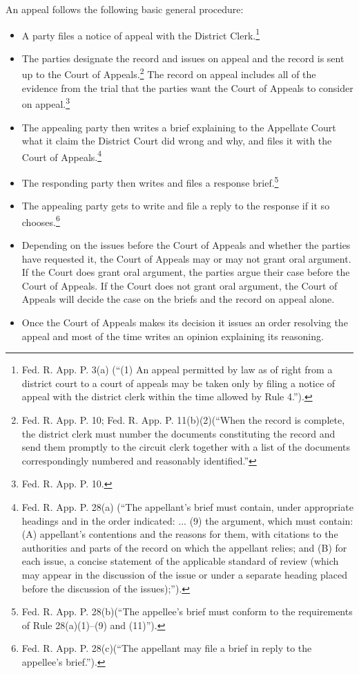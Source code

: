 An appeal follows the following basic general procedure:
\begin{itemize}
\item A party files a notice of appeal with the District Clerk.\footnote{Fed. R. App. P. 3(a) (``(1) An appeal permitted by law as of right from a district court to a court of appeals may be taken only by filing a notice of appeal with the district clerk within the time allowed by Rule 4.'').}
\item The parties designate the record and issues on appeal and the record is sent up to the Court of Appeals.\footnote{Fed. R. App. P. 10; Fed. R. App. P. 11(b)(2)(``When the record is complete, the district clerk must number the documents constituting the record and send them promptly to the circuit clerk together with a list of the documents correspondingly numbered and reasonably identified.''}  The record on appeal includes all of the evidence from the trial that the parties want the Court of Appeals to consider on appeal.\footnote{Fed. R. App. P. 10.}
\item The appealing party then writes a brief explaining to the Appellate Court what it claim the District Court did wrong and why, and files it with the Court of Appeals.\footnote{Fed. R. App. P. 28(a) (``The appellant's brief must contain, under appropriate headings and in the order indicated: ... (9) the argument, which must contain: (A) appellant's contentions and the reasons for them, with citations to the authorities and parts of the record on which the appellant relies; and (B) for each issue, a concise statement of the applicable standard of review (which may appear in the discussion of the issue or under a separate heading placed before the discussion of the issues);'').}
\item The responding party then writes and files a response brief.\footnote{Fed. R. App. P. 28(b)(``The appellee's brief must conform to the requirements of Rule 28(a)(1)--(9) and (11)'').}
\item The appealing party gets to write and file a reply to the response if it so chooses.\footnote{Fed. R. App. P. 28(c)(``The appellant may file a brief in reply to the appellee's brief.'').}
\item Depending on the issues before the Court of Appeals and whether the parties have requested it, the Court of Appeals may or may not grant oral argument.  If the Court does grant oral argument, the parties argue their case before the Court of Appeals.  If the Court does not grant oral argument, the Court of Appeals will decide the case on the briefs and the record on appeal alone.
\item Once the Court of Appeals makes its decision it issues an order resolving the appeal and most of the time writes an opinion explaining its reasoning.
\end{itemize}

